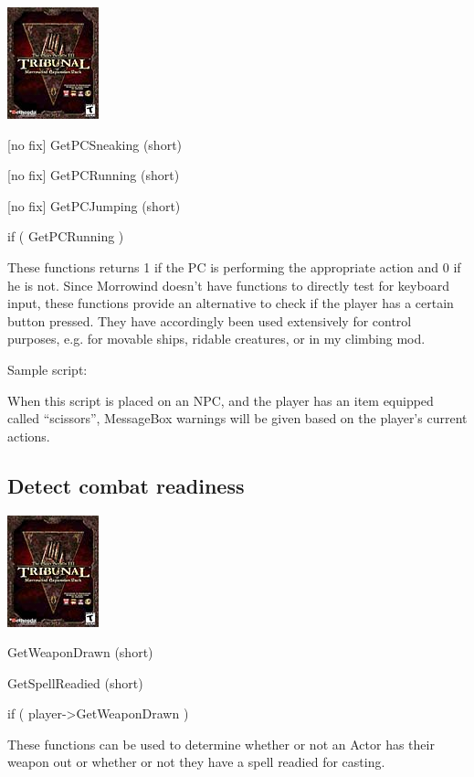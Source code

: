 \includegraphics{media/image6.png}

{[}no fix{]} GetPCSneaking (short)

{[}no fix{]} GetPCRunning (short)

{[}no fix{]} GetPCJumping (short)

if ( GetPCRunning )

These functions returns 1 if the PC is performing the appropriate action
and 0 if he is not. Since Morrowind doesn't have functions to directly
test for keyboard input, these functions provide an alternative to check
if the player has a certain button pressed. They have accordingly been
used extensively for control purposes, e.g. for movable ships, ridable
creatures, or in my climbing mod.

Sample script:

When this script is placed on an NPC, and the player has an item
equipped called ``scissors'', MessageBox warnings will be given based on
the player's current actions.



\hypertarget{detect-combat-readiness}{%
\subsection{Detect combat readiness}\label{detect-combat-readiness}}

\includegraphics{media/image6.png}

GetWeaponDrawn (short)

GetSpellReadied (short)

if ( player-\textgreater GetWeaponDrawn )

These functions can be used to determine whether or not an Actor has
their weapon out or whether or not they have a spell readied for
casting.


